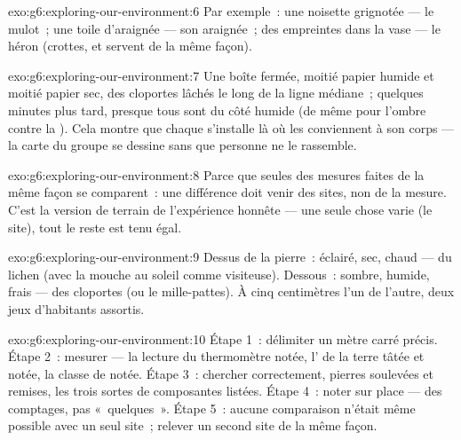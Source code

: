 \begin{solution}{exo:g6:exploring-our-environment:6}
Par exemple~: une noisette grignotée --- le mulot~; une toile
d'araignée --- son araignée~; des empreintes dans la vase --- le
héron (crottes,  et  servent de la même façon).
\end{solution}

\begin{solution}{exo:g6:exploring-our-environment:7}
Une boîte fermée, moitié papier humide et moitié papier sec, des
cloportes lâchés le long de la ligne médiane~; quelques minutes plus
tard, presque tous sont du côté humide (de même pour l'ombre contre
la ). Cela montre que chaque  s'installe là où les
 conviennent à son corps --- la carte du groupe se dessine
sans que personne ne le rassemble.
\end{solution}

\begin{solution}{exo:g6:exploring-our-environment:8}
Parce que seules des mesures faites de la même façon se comparent~:
une différence doit venir des sites, non de la mesure. C'est la
version de terrain de l'expérience honnête --- une seule chose
varie (le site), tout le reste est tenu égal.
\end{solution}

\begin{solution}{exo:g6:exploring-our-environment:9}
Dessus de la pierre~: éclairé, sec, chaud --- du lichen (avec la
mouche au soleil comme visiteuse). Dessous~: sombre, humide, frais
--- des cloportes (ou le mille-pattes). À cinq centimètres l'un de
l'autre, deux jeux d'habitants assortis.
\end{solution}

\begin{solution}{exo:g6:exploring-our-environment:10}
Étape 1~: délimiter un mètre carré précis. Étape 2~: mesurer --- la
lecture du thermomètre notée, l' de la terre tâtée et notée,
la classe de  notée. Étape 3~: chercher correctement, pierres
soulevées et remises, les trois sortes de composantes listées. Étape
4~: noter sur place --- des comptages, pas «~quelques~». Étape 5~:
aucune comparaison n'était même possible avec un seul site~; relever
un second site de la même façon.
\end{solution}

